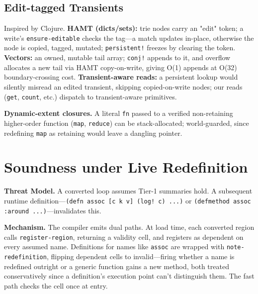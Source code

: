 \documentclass[sigplan,review,anonymous]{acmart}
\begin{document}
\subsection{Edit-tagged Transients}
\label{sec:edittagged}
Inspired by Clojure. \textbf{HAMT (dicts/sets):} trie nodes carry an "edit" token; a write's \texttt{ensure-editable} checks the tag---a match updates in-place, otherwise the node is copied, tagged, mutated; \texttt{persistent!} freezes by clearing the token. \textbf{Vectors:} an owned, mutable tail array; \texttt{conj!} appends to it, and overflow allocates a new tail via HAMT copy-on-write, giving O(1) appends at O(32) boundary-crossing cost. \textbf{Transient-aware reads:} a persistent lookup would silently misread an edited transient, skipping copied-on-write nodes; our reads (\texttt{get}, \texttt{count}, etc.) dispatch to transient-aware primitives.

\textbf{Dynamic-extent closures.} A literal \texttt{fn} passed to a verified non-retaining higher-order function (\texttt{map}, \texttt{reduce}) can be stack-allocated; world-guarded, since redefining \texttt{map} as retaining would leave a dangling pointer.

\section{Soundness under Live Redefinition}
\label{sec:soundness}
\textbf{Threat Model.} A converted loop assumes Tier-1 summaries hold. A subsequent runtime definition---\texttt{(defn assoc [c k v] (log! c) ...)} or \texttt{(defmethod assoc :around ...)}---invalidates this.

\textbf{Mechanism.} The compiler emits dual paths. At load time, each converted region calls \texttt{register-region}, returning a validity cell, and registers as dependent on every assumed name. Definitions for names like \texttt{assoc} are wrapped with \texttt{note-redefinition}, flipping dependent cells to invalid---firing whether a name is redefined outright or a generic function gains a new method, both treated conservatively since a definition's execution point can't distinguish them. The fast path checks the cell once at entry.
\end{document}
